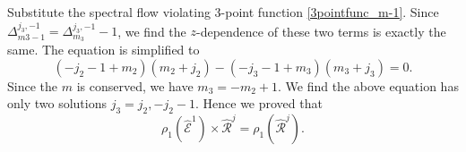 \documentclass[10pt,a4paper]{article}
\numberwithin{equation}{section}
\begin{document}
Substitute the spectral flow violating 3-point function \ref{3pointfunc_m-1}. 
Since $\Delta^{j_{3},-1}_{m3-1} = \Delta^{j_{3},-1}_{m_{3}} - 1$, we find the $z$-dependence of these two terms is exactly the same. 
The equation is simplified to 
\begin{equation}
    (-j_{2}-1+m_{2}) (m_{2}+j_{2}) - (-j_{3}-1+m_{3}) (m_{3}+j_{3}) = 0.
\end{equation}
Since the $m$ is conserved, we have $m_{3} = -m_{2} + 1$. We find the above equation has only two solutions $j_{3} = j_{2}, -j_{2}-1$. 
Hence we proved that 
\begin{equation}
    \rho_{1} \left(\widehat{\mathcal{E}}^{1}\right) \times \widehat{\mathcal{R}}^{j} = \rho_{1} \left( \hat{\mathcal{R}}^{j} \right).
\end{equation}
\end{document}
